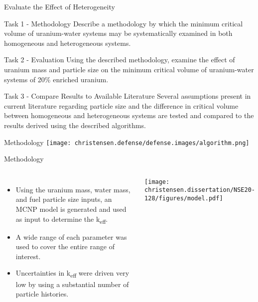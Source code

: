 \documentclass[10pt,aspectratio=169]{beamer}              %
\begin{document}
\begin{frame}{Evaluate the Effect of Heterogeneity}
    \begin{block}{Task 1 - Methodology}
        Describe a methodology by which the minimum critical volume of uranium-water systems may be systematically examined in both homogeneous and heterogeneous systems.
    \end{block}
    \begin{block}{Task 2 - Evaluation}
        Using the described methodology, examine the effect of uranium mass and particle size on the minimum critical volume of uranium-water systems of 20\% enriched uranium.
    \end{block}
    \begin{block}{Task 3 - Compare Results to Available Literature}
        Several assumptions present in current literature regarding particle size and the difference in critical volume between homogeneous and heterogeneous systems are tested and compared to the results derived using the described algorithms.
    \end{block}
\end{frame}

\begin{frame}{Methodology}
    \centering
    \texttt{[image: christensen.defense/defense.images/algorithm.png]}
\end{frame}

\begin{frame}{Methodology}
    \begin{columns}
        \begin{itemize}
            \item Using the uranium mass, water mass, and fuel particle size inputs, an MCNP model is generated and used as input to determine the k\textsubscript{eff}.
            \item A wide range of each parameter was used to cover the entire range of interest.
            \item Uncertainties in k\textsubscript{eff} were driven very low by using a substantial number of particle histories.
        \end{itemize}
            \centering
            \texttt{[image: christensen.dissertation/NSE20-128/figures/model.pdf]}
    \end{columns}
\end{frame}
\end{document}
